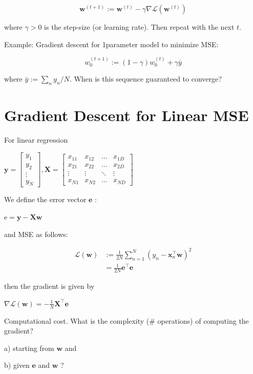\documentclass[10pt]{article}
\begin{document}
$$
\mathbf{w}^{(t+1)}:=\mathbf{w}^{(t)}-\gamma \nabla \mathcal{L}\left(\mathbf{w}^{(t)}\right)
$$

where $\gamma>0$ is the step-size (or learning rate). Then repeat with the next $t$.

Example: Gradient descent for 1parameter model to minimize MSE:

$$
w_{0}^{(t+1)}:=(1-\gamma) w_{0}^{(t)}+\gamma \bar{y}
$$

where $\bar{y}:=\sum_{n} y_{n} / N$. When is this sequence guaranteed to converge?

\section*{Gradient Descent for Linear MSE}
For linear regression

$\mathbf{y}=\left[\begin{array}{c}y_{1} \\ y_{2} \\ \vdots \\ y_{N}\end{array}\right], \mathbf{X}=\left[\begin{array}{cccc}x_{11} & x_{12} & \ldots & x_{1 D} \\ x_{21} & x_{22} & \ldots & x_{2 D} \\ \vdots & \vdots & \ddots & \vdots \\ x_{N 1} & x_{N 2} & \ldots & x_{N D}\end{array}\right]$

We define the error vector $\mathbf{e}$ :

$\mathrm{e}=\mathbf{y}-\mathbf{X w}$

and MSE as follows:

$$
\begin{aligned}
\mathcal{L}(\mathbf{w}) & :=\frac{1}{2 N} \sum_{n=1}^{N}\left(y_{n}-\mathbf{x}_{n}^{\top} \mathbf{w}\right)^{2} \\
& =\frac{1}{2 N} \mathbf{e}^{\top} \mathbf{e}
\end{aligned}
$$

then the gradient is given by

$\nabla \mathcal{L}(\mathbf{w})=-\frac{1}{N} \mathbf{X}^{\top} \mathbf{e}$

Computational cost. What is the complexity (\# operations) of computing the gradient?

a) starting from $\mathbf{w}$ and

b) given $\mathbf{e}$ and $\mathbf{w}$ ?
\end{document}
